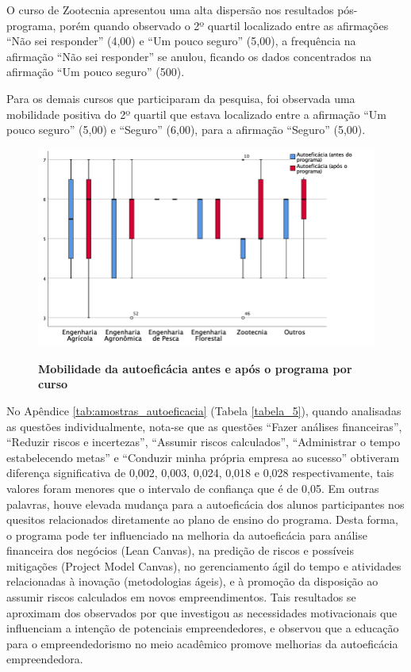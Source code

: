 O curso de Zootecnia apresentou uma alta dispersão nos resultados pós-programa, porém quando observado o 2º quartil localizado entre as afirmações “Não sei responder” (4,00) e “Um pouco seguro” (5,00), a frequência na afirmação “Não sei responder” se anulou, ficando os dados concentrados na afirmação “Um pouco seguro” (500).


Para os demais cursos que participaram da pesquisa, foi observada uma mobilidade positiva do 2º quartil que estava localizado entre a afirmação “Um pouco seguro” (5,00) e “Seguro” (6,00), para a afirmação “Seguro” (5,00).


\begin{figure}[H]
\centering
\caption{\textbf{Mobilidade da autoeficácia antes e após o programa por curso}}
\includegraphics[scale=0.4]{Imagens/boxplot_autoeficacia.png}
\label{figura_34}
\end{figure}


No Apêndice \ref{tab:amostras_autoeficacia} (Tabela \ref{tabela_5}), quando analisadas as questões individualmente, nota-se que as questões “Fazer análises financeiras”, “Reduzir riscos e incertezas”, “Assumir riscos calculados”, “Administrar o tempo estabelecendo metas” e “Conduzir minha própria empresa ao sucesso” obtiveram diferença significativa de 0,002, 0,003, 0,024, 0,018 e 0,028 respectivamente, tais valores foram menores que o intervalo de confiança que é de 0,05. Em outras palavras, houve elevada mudança para a autoeficácia dos alunos participantes nos quesitos relacionados diretamente ao plano de ensino do programa. Desta forma, o programa pode ter influenciado na melhoria da autoeficácia para análise financeira dos negócios (Lean Canvas), na predição de riscos e possíveis mitigações (Project Model Canvas), no gerenciamento ágil do tempo e atividades relacionadas à inovação (metodologias ágeis), e à promoção da disposição ao assumir riscos calculados em novos empreendimentos. Tais resultados se aproximam dos observados por \cite{schaefer_formacao_2017} que investigou as necessidades motivacionais que influenciam a intenção de potenciais empreendedores, e observou que a educação para o empreendedorismo no meio acadêmico promove melhorias da autoeficácia empreendedora.


